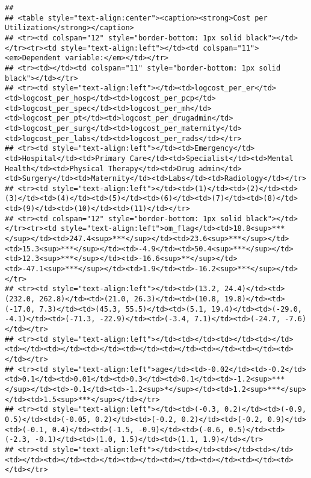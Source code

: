 \documentclass[]{article}
\begin{document}
\begin{verbatim}
## 
## <table style="text-align:center"><caption><strong>Cost per Utilization</strong></caption>
## <tr><td colspan="12" style="border-bottom: 1px solid black"></td></tr><tr><td style="text-align:left"></td><td colspan="11"><em>Dependent variable:</em></td></tr>
## <tr><td></td><td colspan="11" style="border-bottom: 1px solid black"></td></tr>
## <tr><td style="text-align:left"></td><td>logcost_per_er</td><td>logcost_per_hosp</td><td>logcost_per_pcp</td><td>logcost_per_spec</td><td>logcost_per_mh</td><td>logcost_per_pt</td><td>logcost_per_drugadmin</td><td>logcost_per_surg</td><td>logcost_per_maternity</td><td>logcost_per_labs</td><td>logcost_per_rads</td></tr>
## <tr><td style="text-align:left"></td><td>Emergency</td><td>Hospital</td><td>Primary Care</td><td>Specialist</td><td>Mental Health</td><td>Physical Therapy</td><td>Drug admin</td><td>Surgery</td><td>Maternity</td><td>Labs</td><td>Radiology</td></tr>
## <tr><td style="text-align:left"></td><td>(1)</td><td>(2)</td><td>(3)</td><td>(4)</td><td>(5)</td><td>(6)</td><td>(7)</td><td>(8)</td><td>(9)</td><td>(10)</td><td>(11)</td></tr>
## <tr><td colspan="12" style="border-bottom: 1px solid black"></td></tr><tr><td style="text-align:left">om_flag</td><td>18.8<sup>***</sup></td><td>247.4<sup>***</sup></td><td>23.6<sup>***</sup></td><td>15.3<sup>***</sup></td><td>-4.9</td><td>50.4<sup>***</sup></td><td>12.3<sup>***</sup></td><td>-16.6<sup>**</sup></td><td>-47.1<sup>***</sup></td><td>1.9</td><td>-16.2<sup>***</sup></td></tr>
## <tr><td style="text-align:left"></td><td>(13.2, 24.4)</td><td>(232.0, 262.8)</td><td>(21.0, 26.3)</td><td>(10.8, 19.8)</td><td>(-17.0, 7.3)</td><td>(45.3, 55.5)</td><td>(5.1, 19.4)</td><td>(-29.0, -4.1)</td><td>(-71.3, -22.9)</td><td>(-3.4, 7.1)</td><td>(-24.7, -7.6)</td></tr>
## <tr><td style="text-align:left"></td><td></td><td></td><td></td><td></td><td></td><td></td><td></td><td></td><td></td><td></td><td></td></tr>
## <tr><td style="text-align:left">age</td><td>-0.02</td><td>-0.2</td><td>0.1</td><td>0.01</td><td>0.3</td><td>0.1</td><td>-1.2<sup>***</sup></td><td>-0.1</td><td>-1.2<sup>*</sup></td><td>1.2<sup>***</sup></td><td>1.5<sup>***</sup></td></tr>
## <tr><td style="text-align:left"></td><td>(-0.3, 0.2)</td><td>(-0.9, 0.5)</td><td>(-0.05, 0.2)</td><td>(-0.2, 0.2)</td><td>(-0.2, 0.9)</td><td>(-0.1, 0.4)</td><td>(-1.5, -0.9)</td><td>(-0.6, 0.5)</td><td>(-2.3, -0.1)</td><td>(1.0, 1.5)</td><td>(1.1, 1.9)</td></tr>
## <tr><td style="text-align:left"></td><td></td><td></td><td></td><td></td><td></td><td></td><td></td><td></td><td></td><td></td><td></td></tr>

\end{verbatim}
\end{document}
